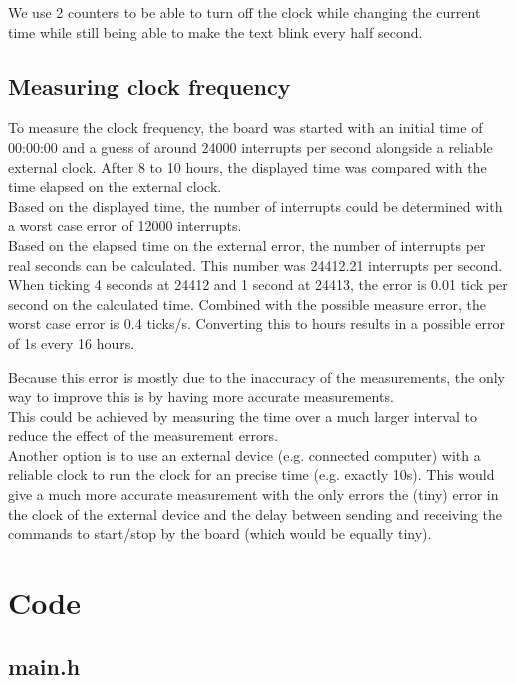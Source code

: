 \documentclass[11pt,a4paper]{scrartcl}
\begin{document}
We use 2 counters to be able to turn off the clock while changing the current time while still being able to make the text blink every half second.

\subsection{Measuring clock frequency}
To measure the clock frequency, the board was started with an initial time of 00:00:00 and a guess of around 24000 interrupts per second alongside a reliable external clock. After 8 to 10 hours, the displayed time was compared with the time elapsed on the external clock.\\
Based on the displayed time, the number of interrupts could be determined with a worst case error of 12000 interrupts.\\
Based on the elapsed time on the external error, the number of interrupts per real seconds can be calculated. This number was 24412.21 interrupts per second.\\
When ticking 4 seconds at 24412 and 1 second at 24413, the error is 0.01 tick per second on the calculated time. Combined with the possible measure error, the worst case error is 0.4 ticks/s. Converting this to hours results in a possible error of 1s every 16 hours.

Because this error is mostly due to the inaccuracy of the measurements, the only way to improve this is by having more accurate measurements.\\
This could be achieved by measuring the time over a much larger interval to reduce the effect of the measurement errors.\\
Another option is to use an external device (e.g. connected computer) with a reliable clock to run the clock for an precise time (e.g. exactly 10s). This would give a much more accurate measurement with the only errors the (tiny) error in the clock of the external device and the delay between sending and receiving the commands to start/stop by the board (which would be equally tiny). 


\newpage

\appendix
\section{Code}

\subsection{main.h}

\end{document}
